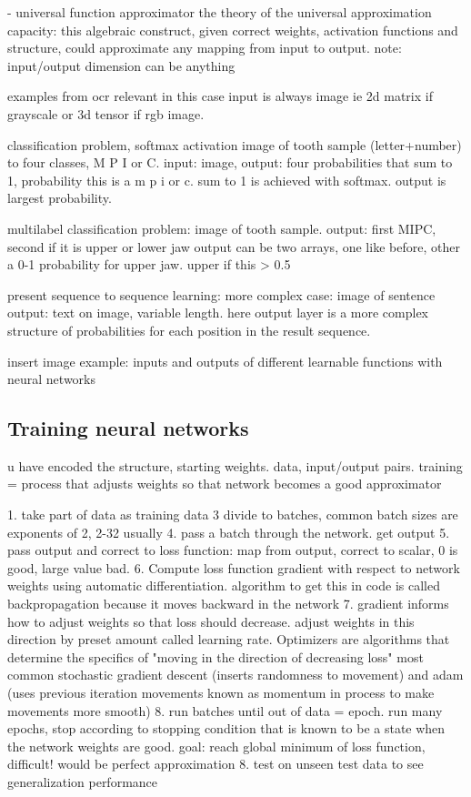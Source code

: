\documentclass{article}
\begin{document}
- universal function approximator
the theory of the universal approximation capacity: this algebraic construct, 
given correct weights, activation functions and structure, could approximate 
any mapping from input to output. note: input/output dimension can be anything

examples from ocr relevant in this case
input is always image ie 2d matrix if grayscale or 3d tensor if rgb image.

classification problem, softmax activation
image of tooth sample (letter+number) to four classes, M P I or C.
input: image, output: four probabilities that sum to 1, probability this is a m
p i or c. sum to 1 is achieved with softmax. output is largest probability.

multilabel classification problem:
image of tooth sample. output: first MIPC, second if it is upper or lower jaw
output can be two arrays, one like before, other a 0-1 probability for upper jaw. upper if this > 0.5 

present sequence to sequence learning:
more complex case: image of sentence
output: text on image, variable length. here output layer is a more complex 
structure of probabilities for each position in the result sequence.

insert image example: inputs and outputs of different learnable functions with neural networks

\subsection{Training neural networks}

u have encoded the structure, starting weights. data, input/output pairs.
training = process that adjusts weights so that network becomes a good 
approximator

1. take part of data as training data
3 divide to batches, common batch sizes are exponents of 2, 2-32 usually 
4. pass a batch through the network. get output 
5. pass output and correct to loss function: map from output, correct to scalar,
0 is good, large value bad.
6. Compute loss function gradient with respect to network weights using automatic differentiation.
algorithm to get this in code is called backpropagation because it moves backward in the network
7. gradient informs how to adjust weights so that loss should decrease. 
adjust weights in this direction by preset amount called learning rate. Optimizers
are algorithms that determine the specifics of "moving in the direction of decreasing loss"
most common stochastic gradient descent (inserts randomness to movement) and 
adam (uses previous iteration movements known as momentum in process to make movements more smooth)
8. run  batches until out of data  = epoch. run many epochs, stop according to 
stopping condition that is known to be a state when the network weights are good.
goal: reach global minimum of loss function, difficult! would be perfect approximation
8. test on unseen test data to see generalization performance
\end{document}
